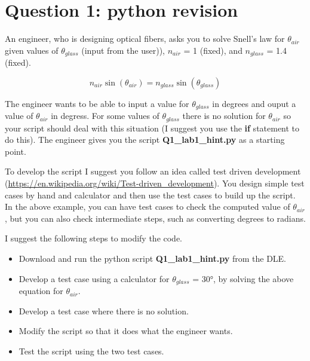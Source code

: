 \section*{Question 1: python revision}

An engineer, who is designing optical fibers, asks you to solve
Snell's law for $\theta_{air}$ given values of $\theta_{glass}$ (input
from the user)),
$n_{air}$ = 1 (fixed), and $n_{glass}$ = 1.4 (fixed).

$$
n_{air} \sin( \theta_{air} ) = n_{glass} \sin( \theta_{glass} ) 
$$

The engineer wants to be able to input a value for
$\theta_{glass}$ in degrees and ouput a value
of $\theta_{air}$ in degress. For some values of $\theta_{glass}$
there is no solution for $\theta_{air}$ so your script should
deal with this situation (I suggest you use the \textbf{if} statement
to do this).
The engineer gives
you the script \textbf{Q1\_lab1\_hint.py} as a starting
point.

To develop the script I suggest you follow an idea called
test driven development
(\url{https://en.wikipedia.org/wiki/Test-driven_development}).
You design simple test cases by hand and calculator and
then use the test cases to build up the script. In the above
example, you can have test cases to check the computed value of
$\theta_{air}$, but you can also check intermediate steps, such as
converting degrees to radians.


I suggest the following steps to modify the code.

\begin{itemize}

\item Download and run the python script \textbf{Q1\_lab1\_hint.py} from
  the DLE.

\item Develop a test case using a calculator for $\theta_{glass}$ =
  30\si{\degree}, by solving the above equation for $\theta_{air}$.

\item Develop a test case where there is no solution.

\item Modify the script so that it does what the engineer wants.

\item Test the script using the two test cases.

\end{itemize}


